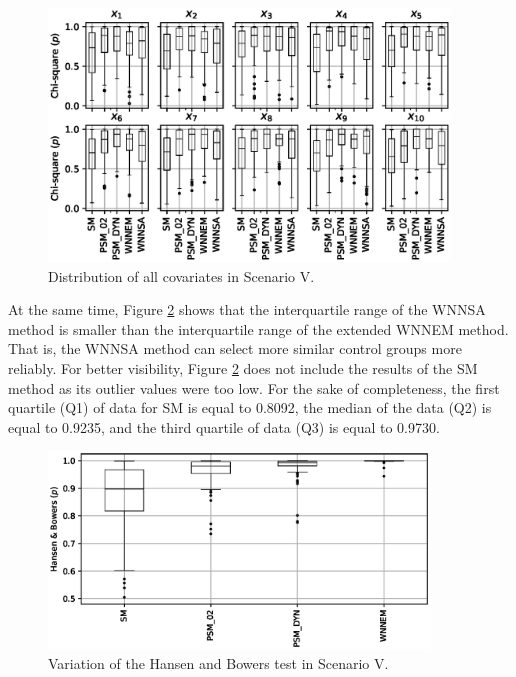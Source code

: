 		\begin{figure}[h]
			\centering
                \captionsetup{justification=centering}
			\includegraphics[width=0.95\textwidth]{assets/figures/control_group_selection/wnnsa/scenV/distribution.eps}
			\caption{Distribution of all covariates in Scenario V. %
			}
			\label{fig:wnnsa_scen_V_distribtuion}   
		\end{figure}			
		
		At the same time, Figure \ref{fig:wnnsa_scen_V_hbp} shows that the interquartile range of the WNNSA method is smaller than the interquartile range of the extended WNNEM method. That is, the WNNSA method can select more similar control groups more reliably. For better visibility, Figure  \ref{fig:wnnsa_scen_V_hbp} does not include the results of the SM method as its outlier values were too low. For the sake of completeness, the first quartile (Q1) of data for SM is equal to 0.8092, the median of the data (Q2) is equal to 0.9235, and the third quartile of data (Q3) is equal to 0.9730.
								
		\begin{figure}[h]
			\centering
                \captionsetup{justification=centering}
			\includegraphics[width=0.9\textwidth]{assets/figures/control_group_selection/wnnsa/scenIV/hbp.eps}
			\caption{Variation of the Hansen and Bowers test in Scenario V. %
			}
			\label{fig:wnnsa_scen_V_hbp}    
		\end{figure}
		
